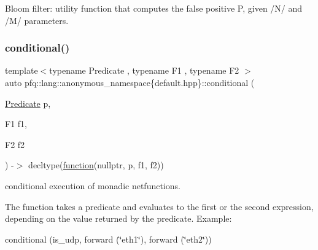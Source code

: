 Bloom filter\+: utility function that computes the false positive P, given /\+N/ and /\+M/ parameters. 

\mbox{\label{namespacepfq_1_1lang_1_1anonymous__namespace_02default_8hpp_03_a4c2783d63248b4a03efebee81e68cad3}} 
\subsubsection{\texorpdfstring{conditional()}{conditional()}}
{\footnotesize\ttfamily template$<$typename Predicate , typename F1 , typename F2 $>$ \\
auto pfq\+::lang\+::anonymous\+\_\+namespace\{default.\+hpp\}\+::conditional (\begin{DoxyParamCaption}\item[{\hyperlink{structpfq_1_1lang_1_1Predicate}{Predicate}}]{p,  }\item[{F1}]{f1,  }\item[{F2}]{f2 }\end{DoxyParamCaption}) -\/$>$ decltype(\hyperlink{namespacepfq_1_1lang_a1a4638059d700ae08d0ca63886ff2bb3}{function}(nullptr, p, f1, f2))
        }



conditional execution of monadic netfunctions. 

The function takes a predicate and evaluates to the first or the second expression, depending on the value returned by the predicate. Example\+:

conditional (is\+\_\+udp, forward (\char`\"{}eth1\char`\"{}), forward (\char`\"{}eth2\char`\"{})) \mbox{\label{namespacepfq_1_1lang_1_1anonymous__namespace_02default_8hpp_03_ab6609fc892c99d59d772832ff2ba8beb}} 
